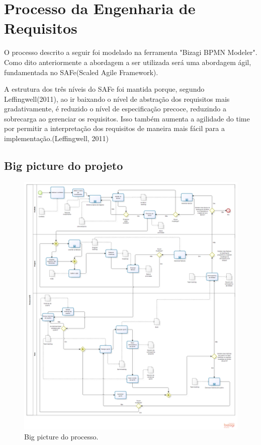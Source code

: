 \chapter[Processo da Engenharia de Requisitos]{Processo da Engenharia de Requisitos}
O processo descrito a seguir foi modelado na ferramenta "Bizagi BPMN Modeler". Como dito anteriormente a abordagem a ser utilizada será uma abordagem ágil, fundamentada no SAFe(Scaled Agile Framework).

A estrutura dos três níveis do SAFe foi mantida porque, segundo Leffingwell(2011), ao ir baixando o nível de abstração dos requisitos mais gradativamente, é reduzido o nível de especificação precoce, reduzindo a sobrecarga ao gerenciar os requisitos. Isso também aumenta a agilidade do time por permitir a interpretação dos requisitos de maneira mais fácil para a implementação.(Leffingwell, 2011)
\section{Big picture do projeto}
  \begin{figure}[!htbp]
    \centering
    \includegraphics[scale=0.25]{editaveis/figuras/Processo_v1}
    \caption[Big picture do processo.]{Big picture do processo. \footnotemark}
    \label{processo}
  \end{figure}
